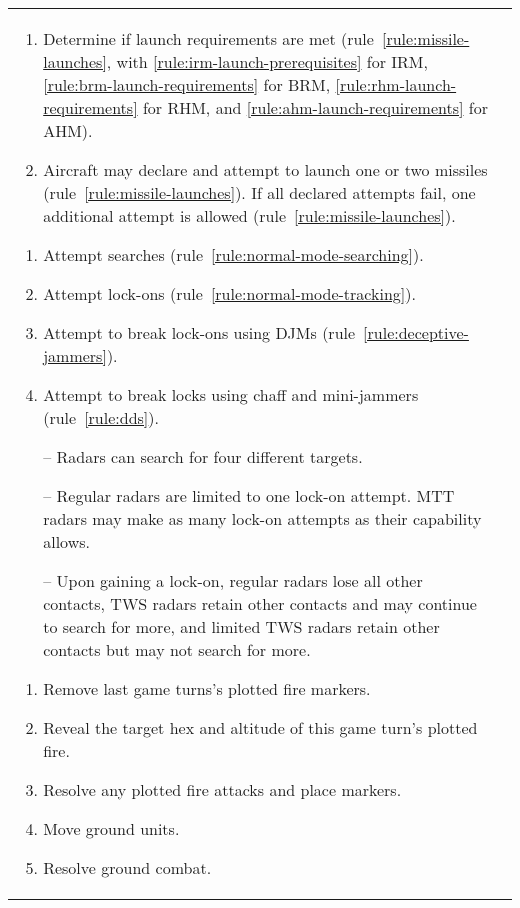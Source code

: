 \begin{twocolumntablefloat}
\begin{twocolumntable}
\begin{tabularx}{1.0\linewidth}{L@{\hspace{\columnsep}}L}
{\begin{enumerate}[topsep=0pt,start=7]

\begin{enumerate}[nosep]
    \item Determine if launch requirements are met (rule~\ref{rule:missile-launches}, with \ref{rule:irm-launch-prerequisites} for IRM, \ref{rule:brm-launch-requirements} for BRM, \ref{rule:rhm-launch-requirements} for RHM, and \ref{rule:ahm-launch-requirements} for AHM).
    \item Aircraft may declare and attempt to launch one or two missiles (rule~\ref{rule:missile-launches}). If all declared attempts fail, one additional attempt is allowed (rule~\ref{rule:missile-launches}).
\end{enumerate}


\begin{enumerate}[nosep]
    \item Attempt searches (rule~\ref{rule:normal-mode-searching}).
    \item Attempt lock-ons (rule~\ref{rule:normal-mode-tracking}).
    \item Attempt to break lock-ons using DJMs (rule~\ref{rule:deceptive-jammers}).
    \item Attempt to break locks using chaff and mini-jammers (rule~\ref{rule:dds}).
    \item[--] Radars can search for four different targets.
    \item[--] Regular radars are limited to one lock-on attempt. MTT radars may make as many lock-on attempts as their capability allows.
    \item[--] Upon gaining a lock-on, regular radars lose all other contacts, TWS radars retain other contacts and may continue to search for more, and limited TWS radars retain other contacts but may not search for more.    
\end{enumerate}


\begin{enumerate}[nosep]
    \item Remove last game turns's plotted fire markers.
    \item Reveal the target hex and altitude of this game turn's plotted fire.
    \item Resolve any plotted fire attacks and place markers.
    \item Move ground units.
    \item Resolve ground combat.
\end{enumerate}


\end{enumerate}}
\end{tabularx}
\end{twocolumntable}
\end{twocolumntablefloat}
